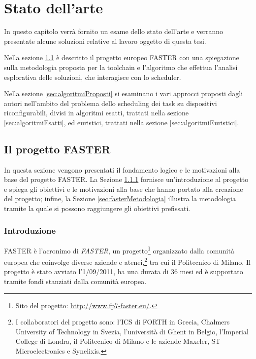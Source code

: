 \chapter{Stato dell'arte}
\label{chap:SOA}
\vspace{1cm}
In questo capitolo verrà fornito un esame dello stato dell'arte e verranno presentate 
alcune soluzioni relative al lavoro oggetto di questa tesi.

Nella sezione \ref{sec:progettoFASTER} è descritto il progetto europeo 
\acs{FASTER} con una spiegazione sulla metodologia proposta per la toolchain e 
l'algoritmo che effettua l'analisi esplorativa delle soluzioni, che interagisce 
con lo scheduler.

Nella sezione \ref{sec:algoritmiProposti} si esaminano i vari approcci proposti 
dagli autori nell'ambito del problema dello scheduling dei task su dispositivi 
riconfigurabili, divisi in algoritmi esatti, trattati nella sezione 
\ref{sec:algoritmiEsatti}, ed euristici, trattati nella sezione 
\ref{sec:algoritmiEuristici}.


\section[Il progetto \acs{FASTER}]{Il progetto \acs{FASTER}}
\label{sec:progettoFASTER}
In questa sezione vengono presentati il fondamento logico e le motivazioni alla 
base del progetto \acs{FASTER}. La Sezione \ref{subsec:fasterIntro} fornisce 
un'introduzione al progetto e spiega gli obiettivi e le motivazioni alla 
base che hanno portato alla creazione del progetto; infine, la Sezione 
\ref{sec:fasterMetodologia} illustra la metodologia tramite la quale si possono 
raggiungere gli obiettivi prefissati.




\subsection{Introduzione}
\label{subsec:fasterIntro}
\acs{FASTER} è l'acronimo di \emph{\acl{FASTER}}, un progetto\footnote{Sito del 
progetto: \url{http://www.fp7-faster.eu/}.} organizzato dalla comunità europea 
che coinvolge diverse aziende e atenei,\footnote{I collaboratori del progetto 
sono: l'\ac{ICS} di \ac{FORTH} in Grecia, Chalmers University of Technology in 
Svezia, l'università di Ghent in Belgio, l'Imperial College di Londra, il 
Politecnico di Milano e le aziende Maxeler, ST Microelectronics e Synelixis.} 
tra cui il Politecnico di Milano. Il progetto è stato avviato l'1/09/2011,
ha una durata di 36 mesi ed è supportato tramite fondi stanziati dalla 
comunità europea.

